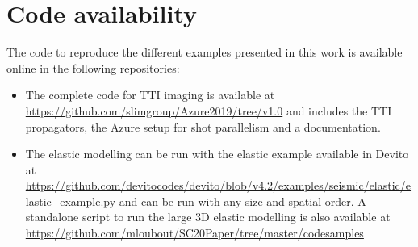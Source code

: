 \documentclass[10pt, conference]{IEEEtran}
\begin{document}
\section{Code availability}

The code to reproduce the different examples presented in this work is available online in the following repositories:

\begin{itemize}
  \item The complete code for TTI imaging is available at \url{https://github.com/slimgroup/Azure2019/tree/v1.0} and includes 
  the TTI propagators, the Azure setup for shot parallelism and a documentation.
  \item The elastic modelling can be run with the elastic example available in Devito at
  \url{https://github.com/devitocodes/devito/blob/v4.2/examples/seismic/elastic/elastic_example.py} 
  and can be run with any size and spatial order. A standalone script to run the large 3D elastic modelling
  is also available at \url{https://github.com/mloubout/SC20Paper/tree/master/codesamples}
\end{itemize}


\end{document}
